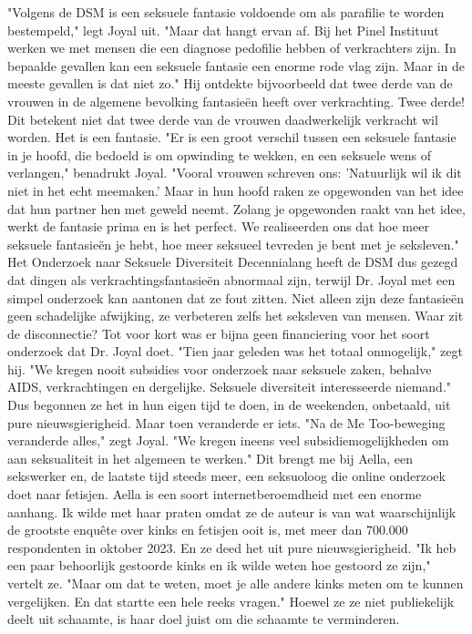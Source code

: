 "Volgens de DSM is een seksuele fantasie voldoende om als parafilie te worden bestempeld," legt Joyal uit. "Maar dat hangt ervan af. Bij het Pinel Instituut werken we met mensen die een diagnose pedofilie hebben of verkrachters zijn. In bepaalde gevallen kan een seksuele fantasie een enorme rode vlag zijn. Maar in de meeste gevallen is dat niet zo." Hij ontdekte bijvoorbeeld dat twee derde van de vrouwen in de algemene bevolking fantasieën heeft over verkrachting. Twee derde! Dit betekent niet dat twee derde van de vrouwen daadwerkelijk verkracht wil worden. Het is een fantasie. "Er is een groot verschil tussen een seksuele fantasie in je hoofd, die bedoeld is om opwinding te wekken, en een seksuele wens of verlangen," benadrukt Joyal. "Vooral vrouwen schreven ons: 'Natuurlijk wil ik dit niet in het echt meemaken.' Maar in hun hoofd raken ze opgewonden van het idee dat hun partner hen met geweld neemt. Zolang je opgewonden raakt van het idee, werkt de fantasie prima en is het perfect. We realiseerden ons dat hoe meer seksuele fantasieën je hebt, hoe meer seksueel tevreden je bent met je seksleven."
Het Onderzoek naar Seksuele Diversiteit
Decennialang heeft de DSM dus gezegd dat dingen als verkrachtingsfantasieën abnormaal zijn, terwijl Dr. Joyal met een simpel onderzoek kan aantonen dat ze fout zitten. Niet alleen zijn deze fantasieën geen schadelijke afwijking, ze verbeteren zelfs het seksleven van mensen. Waar zit de disconnectie? Tot voor kort was er bijna geen financiering voor het soort onderzoek dat Dr. Joyal doet. "Tien jaar geleden was het totaal onmogelijk," zegt hij. "We kregen nooit subsidies voor onderzoek naar seksuele zaken, behalve AIDS, verkrachtingen en dergelijke. Seksuele diversiteit interesseerde niemand." Dus begonnen ze het in hun eigen tijd te doen, in de weekenden, onbetaald, uit pure nieuwsgierigheid.
Maar toen veranderde er iets. "Na de Me Too-beweging veranderde alles," zegt Joyal. "We kregen ineens veel subsidiemogelijkheden om aan seksualiteit in het algemeen te werken."
Dit brengt me bij Aella, een sekswerker en, de laatste tijd steeds meer, een seksuoloog die online onderzoek doet naar fetisjen. Aella is een soort internetberoemdheid met een enorme aanhang. Ik wilde met haar praten omdat ze de auteur is van wat waarschijnlijk de grootste enquête over kinks en fetisjen ooit is, met meer dan 700.000 respondenten in oktober 2023. En ze deed het uit pure nieuwsgierigheid. "Ik heb een paar behoorlijk gestoorde kinks en ik wilde weten hoe gestoord ze zijn," vertelt ze. "Maar om dat te weten, moet je alle andere kinks meten om te kunnen vergelijken. En dat startte een hele reeks vragen." Hoewel ze ze niet publiekelijk deelt uit schaamte, is haar doel juist om die schaamte te verminderen.
